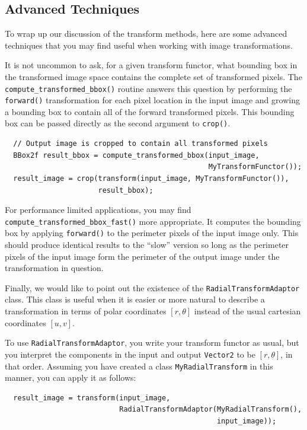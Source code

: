 \subsection{Advanced Techniques}
\label{sec:transform-advanced-techniques}

To wrap up our discussion of the transform methods, here are some
advanced techniques that you may find useful when working with image
transformations.

It is not uncommon to ask, for a given transform functor, what
bounding box in the transformed image space contains the complete set
of transformed pixels.  The \verb#compute_transformed_bbox()# routine
answers this question by performing the \verb#forward()#
transformation for each pixel location in the input image and growing
a bounding box to contain all of the forward transformed pixels.  This
bounding box can be passed directly as the second argument to
\verb#crop()#.

\begin{verbatim} 
  // Output image is cropped to contain all transformed pixels
  BBox2f result_bbox = compute_transformed_bbox(input_image, 
                                                MyTransformFunctor());
  result_image = crop(transform(input_image, MyTransformFunctor()),
                      result_bbox);
\end{verbatim}

For performance limited applications, you may find
\verb#compute_transformed_bbox_fast()# more appropriate.  It computes
the bounding box by applying \verb#forward()# to the perimeter pixels
of the input image only.  This should produce identical results to the
``slow'' version so long as the perimeter pixels of the input
image form the perimeter of the output image under the transformation
in question.

Finally, we would like to point out the existence of the
\verb#RadialTransformAdaptor# class.  This class is useful when it is
easier or more natural to describe a transformation in terms of polar
coordinates $[r,\theta]$ instead of the usual cartesian coordinates
$[u, v]$.

To use \verb#RadialTransformAdaptor#, you write your transform functor
as usual, but you interpret the components in the input and output
\verb#Vector2# to be $[r,\theta]$, in that order.  Assuming you have
created a class \verb#MyRadialTransform# in this manner, you can apply
it as follows:

\begin{verbatim} 
  result_image = transform(input_image, 
                           RadialTransformAdaptor(MyRadialTransform(),
                                                  input_image));
\end{verbatim}

